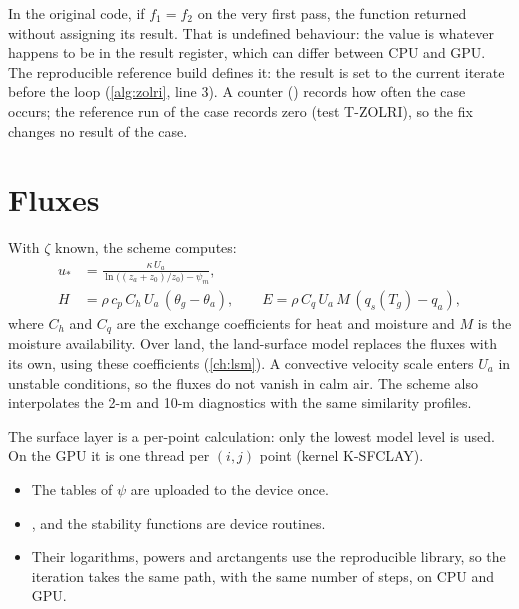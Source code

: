 \begin{portnote}
In the original code, if $f_1 = f_2$ on the very first pass, the function returned without assigning its result.
That is undefined behaviour: the value is whatever happens to be in the result register, which can differ between
CPU and GPU. The reproducible reference build defines it: the result is set to the current iterate before the loop
(\cref{alg:zolri}, line 3). A counter () records how often the case occurs; the reference
run of the case records zero (test T-ZOLRI), so the fix changes no result of the case.
\end{portnote}

\section{Fluxes}

With $\zeta$ known, the scheme computes:
\begin{align}
  u_* &= \frac{\kappa\,U_a}{\ln\bigl((z_a + z_0)/z_0\bigr) - \psi_m}, \\
  H &= \rho\,c_p\,C_h\,U_a\,(\theta_g - \theta_a), \qquad
  E = \rho\,C_q\,U_a\,M\,(q_{s}(T_g) - q_a),
\end{align}
where $C_h$ and $C_q$ are the exchange coefficients for heat and moisture and $M$ is the moisture availability. Over
land, the land-surface model replaces the fluxes with its own, using these coefficients (\cref{ch:lsm}). A
convective velocity scale enters $U_a$ in unstable conditions, so the fluxes do not vanish in calm air. The scheme also
interpolates the 2-m and 10-m diagnostics with the same similarity profiles.

\begin{portnote}
The surface layer is a per-point calculation: only the lowest model level is used. On the GPU it is one thread per
$(i,j)$ point (kernel K-SFCLAY).
\begin{itemize}
  \item The tables of $\psi$ are uploaded to the device once.
  \item {},  and the stability functions are device routines.
  \item Their logarithms, powers and arctangents use the reproducible library, so the iteration takes the same path,
    with the same number of steps, on CPU and GPU.
\end{itemize}
\end{portnote}
